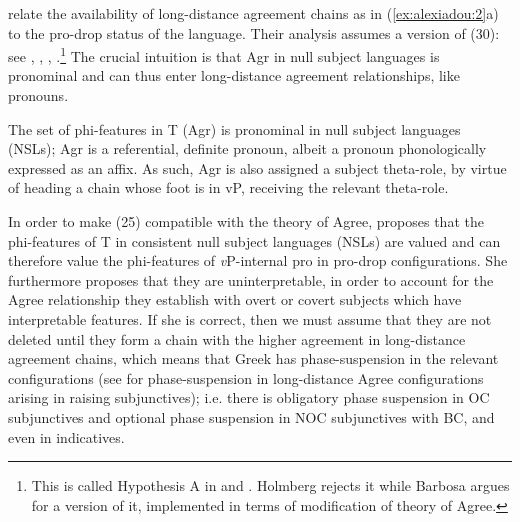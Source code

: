 \documentclass[output=paper]{langsci/langscibook}
\begin{document}
\begin{exe}%
    \z
\end{exe}


\citet{Tsakali2017} relate the availability of long-distance agreement chains as in (\ref{ex:alexiadou:2}a) to the pro-drop status of the language. Their analysis assumes a version of (30): see \citet{Rizzi1982}, \citet{Alexiadou1998}, \citet{Holmberg2005}, \citet{Barbosa2009}.\footnote{This is called Hypothesis A in \citet{Holmberg2005} and \citet{Barbosa2009}. Holmberg rejects it while Barbosa argues for a version of it, implemented in terms of  modification of  theory of Agree.} The crucial intuition is that Agr in null subject languages is pronominal and can thus enter long-distance agreement relationships, like pronouns.

\ea%
    \label{ex:alexiadou:30}
    The set of phi-features in T (Agr) is pronominal in null subject languages (NSLs); Agr is a referential, definite pronoun, albeit a pronoun phonologically expressed as an affix. As such, Agr is also assigned a subject theta-role, by virtue of heading a chain whose foot is in vP, receiving the relevant theta-role.
    \z

          

In order to make (25) compatible with the theory of Agree, \citet{Barbosa2009} proposes that the phi-features of T in consistent null subject languages (NSLs) are valued and can therefore value the phi-features of \textit{v}P-internal pro in pro-drop configurations. She furthermore proposes that they are uninterpretable, in order to account for the Agree relationship they establish with overt or covert subjects which have interpretable features. If she is correct, then we must assume that they are not deleted until they form a chain with the higher agreement in long-distance agreement chains, which means that Greek has phase-suspension in the relevant configurations (see \citealt{Alexiadou2014} for phase-suspension in long-distance Agree configurations arising in raising subjunctives); i.e. there is obligatory phase suspension in OC subjunctives and optional phase suspension in NOC subjunctives with BC, and even in indicatives.  
\end{document}
